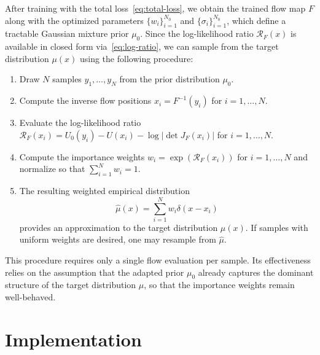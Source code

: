\documentclass{article}
\theoremstyle{plain}
\begin{document}
After training with the total loss~\eqref{eq:total-loss}, we obtain the trained flow map $F$ along with the optimized parameters $\{w_i\}_{i=1}^{N_0}$ and $\{\sigma_i\}_{i=1}^{N_0}$, which define a tractable Gaussian mixture prior $\mu_0$. Since the log-likelihood ratio $\mathcal R_F(x)$ is available in closed form via~\eqref{eq:log-ratio}, we can sample from the target distribution $\mu(x)$ using the following procedure:
\begin{enumerate}
    \item Draw $N$ samples $y_1,\dots,y_N$ from the prior distribution $\mu_0$.
    \item Compute the inverse flow positions $x_i = F^{-1}(y_i)$ for $i=1,\dots,N$.
    \item Evaluate the log-likelihood ratio $\mathcal R_F(x_i) = U_0(y_i) - U(x_i) - \log|\det J_F(x_i)|$ for $i=1,\dots,N$.
    \item Compute the importance weights $w_i = \exp(\mathcal R_F(x_i))$ for $i=1,\dots,N$ and normalize so that $\sum_{i=1}^N w_i = 1$.
    \item The resulting weighted empirical distribution
    \begin{equation*}
        \hat \mu(x)= \sum_{i=1}^N w_i \delta(x-x_i)
    \end{equation*}
    provides an approximation to the target distribution $\mu(x)$. If samples with uniform weights are desired, one may resample from $\hat\mu$.
\end{enumerate}
This procedure requires only a single flow evaluation per sample. Its effectiveness relies on the assumption that the adapted prior $\mu_0$ already captures the dominant structure of the target distribution $\mu$, so that the importance weights remain well-behaved.

\section{Implementation}
\end{document}
